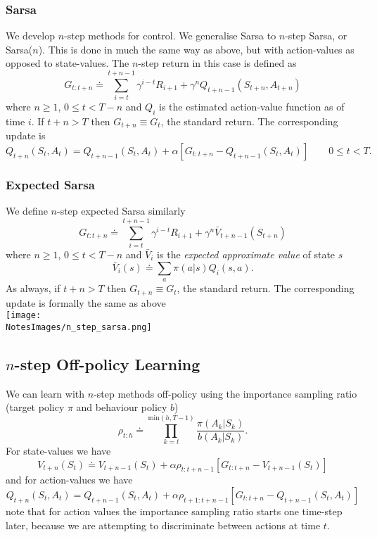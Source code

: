 \subsubsection*{Sarsa}
We develop $n$-step methods for control. We generalise Sarsa to $n$-step Sarsa, or Sarsa($n$). This is done in much the same way as above, but with action-values as opposed to state-values. The $n$-step return in this case is defined as
\begin{equation}
    G_{t:t+n} \doteq \sum_{i=t}^{t+n-1}\gamma^{i-t}R_{i+1} + \gamma^n Q_{t+n-1}(S_{t+n}, A_{t+n})
\end{equation}
where $n \geq 1$, $0 \leq t < T - n$ and $Q_i$ is the estimated action-value function as of time $i$. If $t + n > T$ then $G_{t+n} \equiv G_t$, the standard return. The corresponding update is
\begin{equation}
    Q_{t+n}(S_t, A_t) = Q_{t+n-1}(S_t, A_t) + \alpha [G_{t:t+n} - Q_{t+n-1}(S_{t}, A_{t})]  \quad\quad 0 \leq t < T.
\end{equation}

\subsubsection*{Expected Sarsa}
We define $n$-step expected Sarsa similarly
\begin{equation}
    G_{t:t+n} \doteq \sum_{i=t}^{t+n-1}\gamma^{i-t}R_{i+1} + \gamma^n \bar{V}_{t+n-1}(S_{t+n})
\end{equation}
where $n \geq 1$, $0 \leq t < T - n$ and $\bar{V}_i$ is the \emph{expected approximate value} of state $s$
\begin{equation}
    \bar{V}_i(s) \doteq \sum_a \pi(a|s)Q_i(s, a).
\end{equation} 
As always, if $t + n > T$ then $G_{t+n} \equiv G_t$, the standard return. The corresponding update is formally the same as above\\


\texttt{[image: \\NotesImages/n\_step\_sarsa.png]}\\

\subsection{$n$-step Off-policy Learning}
We can learn with $n$-step methods off-policy using the importance sampling ratio (target policy $\pi$ and behaviour policy $b$)
\[
    \rho_{t:h} \doteq \prod_{k=t}^{\text{min}(h, T-1)}\frac{\pi(A_k|S_k)}{b(A_k|S_k)}.
\]
For state-values we have 
\[
    V_{t+n}(S_t) \doteq V_{t+n-1}(S_t) + \alpha \rho_{t:t+n-1}[G_{t:t+n} - V_{t+n-1}(S_t)]
\]
and for action-values we have
\[
    Q_{t+n}(S_t, A_t) = Q_{t+n-1}(S_t, A_t) + \alpha \rho_{t+1:t+n-1}[G_{t:t+n} - Q_{t+n-1}(S_t, A_t)]
\]
note that for action values the importance sampling ratio starts one time-step later, because we are attempting to discriminate between actions at time $t$.\\

